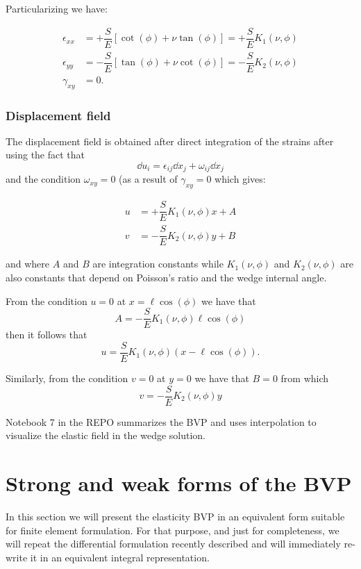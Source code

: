 Particularizing we have:

\begin{equation}
\begin{aligned}
\epsilon_{xx}& = +\dfrac{S}{E}\left[\cot(\phi)+\nu \tan(\phi)\right] = +\dfrac{S}{E}K_{1}(\nu , \phi)\\
\epsilon_{yy}& = -\dfrac{S}{E}\left[\tan(\phi)+\nu \cot(\phi)\right] = -\dfrac{S}{E}K_{2}(\nu , \phi)\\
\gamma_{xy}& = 0.
\end{aligned}
\label{eq:strain part}
\end{equation}

\subsubsection*{Displacement field}
The displacement field is obtained after direct integration of the strains after using the fact that
\[\dd{u}_i = \epsilon_{ij} \dd{x}_j + \omega_{ij}\dd{x}_j\]
and the condition $\omega_{xy}=0$ (as a result of $\gamma_{xy} = 0$ which gives:

\begin{align*}
u &= +\dfrac{S}{E} K_{1}(\nu , \phi)x + A\\
v &= -\dfrac{S}{E} K_{2}(\nu , \phi)y + B
\end{align*}

and where $A$ and $B$ are integration constants while $K_{1}(\nu , \phi)$ and $K_{2}(\nu , \phi)$ are also constants that depend on Poisson's ratio and the wedge internal angle.

From the condition $u=0$ at $x=\ell\cos(\phi)$ we have that
\[A=-\dfrac{S}{E} K_{1}(\nu , \phi)\ell\cos(\phi)\]
then it follows that
\[u=\dfrac{S}{E} K_{1}(\nu , \phi)(x-\ell\cos(\phi)).\]

Similarly, from the condition $v=0$ at $y=0$ we have that $B=0$ from which
\[v=-\dfrac{S}{E} K_{2}(\nu , \phi)y\]

\begin{tcolorbox}
Notebook 7 in the REPO summarizes the BVP and uses interpolation to visualize the elastic field in the wedge solution.
\end{tcolorbox}


\section{Strong and weak forms of the BVP}
In this section we will present the elasticity BVP in an equivalent form suitable for finite element formulation. For that purpose, and just for completeness, we will repeat the differential formulation recently described and will immediately re-write it in an equivalent integral representation.
